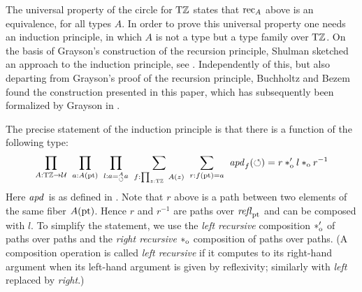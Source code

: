 \documentclass[a4paper,12pt]{amsart}
\begin{document}
The universal property of the circle for ${\mathrm{T}\mathbb{Z}}$
states that ${\mathop{\mathrm{rec}}}_A$ above is an equivalence, for all types $A$.
In order to prove this universal property one needs an induction
principle, in which $A$ is not a type but a type family over ${\mathrm{T}\mathbb{Z}}$.
On the basis of Grayson's construction of the recursion principle,
Shulman sketched an approach to the induction principle, see \cite{circleind-Mike}. 
Independently of this, but also departing from Grayson's proof of the 
recursion principle, Buchholtz and Bezem found the construction
presented in this paper, which has subsequently been formalized
by Grayson \cite{circleind-Dan,circleind-Dan-theorem} in \UniMath.  

The precise statement of the induction principle is that there is a 
function of the following type:
\begin{equation}
  \label{circleinductionequation}
  \thinmuskip=10mu              %
  \prod_{A: \TorZ\to\UU}
  \prod_{a: A(\pt)}
  \prod_{l: a=^A_{\Zloop} a}
  \sum_{f: \prod_{z:\TorZ} A(z)}
  \sum_{r: f(\pt)= a}
  {\apd{f}(\Zloop) = r\cto' l \cto r^{-1}}
\end{equation}
Here $\mathop{{\it apd}_{}}$ is as defined in \cite[Ch. 2.3]{hottbook}.
Note that $r$ above is a path between two elements of the same fiber $A({\mathord{\mathrm{pt}}})$.
Hence $r$ and $r^{-1}$ are paths over $\mathop{{\it refl}_{{\mathord{\mathrm{pt}}}}}$ and can be composed with $l$.
To simplify the statement, we use the \emph{left recursive} 
composition $*_{\mathrm{o}}'$ of paths over paths and the \emph{right recursive} $*_{\mathrm{o}}$ composition of paths over paths.
(A composition operation is called \emph{left recursive} if it computes to its right-hand argument when its
 left-hand argument is given by reflexivity; similarly with \emph{left} replaced by \emph{right}.)
\end{document}
